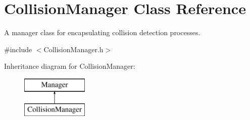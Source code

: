 \hypertarget{class_collision_manager}{}\section{Collision\+Manager Class Reference}
\label{class_collision_manager}


A manager class for encapsulating collision detection processes.  




{\ttfamily \#include $<$Collision\+Manager.\+h$>$}

Inheritance diagram for Collision\+Manager\+:\begin{figure}[H]
\begin{center}
\leavevmode
\includegraphics[height=2.000000cm]{class_collision_manager}
\end{center}
\end{figure}
